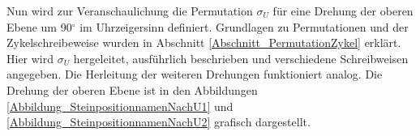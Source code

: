 \documentclass[12pt,a4paper, usenames, dvipsnames]{article}
\theoremstyle{mystyle}
\theoremstyle{definition}
\begin{document}
Nun wird zur Veranschaulichung die Permutation $\sigma_U$ für eine Drehung der oberen Ebene um 90$^\circ$ im Uhrzeigersinn definiert. Grundlagen zu Permutationen und der Zykelschreibeweise wurden in Abschnitt \ref{Abschnitt_PermutationZykel} erklärt.
Hier wird $\sigma_U$ hergeleitet, ausführlich beschrieben und verschiedene Schreibweisen angegeben. Die Herleitung der weiteren Drehungen funktioniert analog. 
Die Drehung der oberen Ebene ist in den Abbildungen \ref{Abbildung_SteinpositionnamenNachU1} und \ref{Abbildung_SteinpositionnamenNachU2} grafisch dargestellt.

\end{document}
